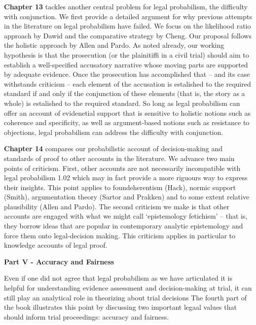 \documentclass[10pt,dvipsnames,enabledeprecatedfontcommands]{scrartcl}
\begin{document}
\textbf{Chapter 13} tackles another central problem for legal
probabilism, the difficulty with conjunction. We first provide a
detailed argument for why previous attempts in the literature on legal
probabilism have failed. We focus on the likelihood ratio approach by
Dawid and the comparative strategy by Cheng. Our proposal follows the
holistic approach by Allen and Pardo. As noted already, our working
hypothesis is that the prosecution (or the plainitiffi in a civil trial)
should aim to establish a well-specified accusatory narrative whose
moving parts are supported by adequate evidence. Once the prosecution
has accomplished that -- and its case withstands criticism -- each
element of the accusation is estalished to the required standard if and
only if the conjunction of these elements (that is, the story as a
whole) is estalished to the required standard. So long as legal
probabilism can offer an account of evidenetial support that is
sensitive to holistic notions such as coherence and specificity, as well
as argument-based notions such as resistance to objections, legal
probabilism can address the difficulty with conjunction.

\textbf{Chapter 14} compares our probabilistic account of
decision-making and standards of proof to other accounts in the
literature. We advance two main points of criticism. First, other
accounts are not necessarily incompatible with legal probabilism 1.02
which may in fact provide a more riguours way to express their insights.
This point applies to foundeherentism (Hack), normic support (Smith),
argumentation theory (Sartor and Prakken) and to some extent relative
plausibility (Allen and Pardo). The second criticism we make is that
other accounts are engaged with what we might call `epistemology
fetichism' -- that is, they borrow ideas that are popular in
contemporary analytic epistemology and force them onto legal-decision
making. This criticism applies in particular to knowledge accounts of
legal proof.

\vspace{3mm} \noindent
\textbf{Part V - Accuracy and Fairness}

\noindent
Even if one did not agree that legal probabilism as we have articulated
it is helpful for understanding evidence assessment and decision-making
at trial, it can still play an analytical role in theorizing about trial
decisions The fourth part of the book illustrates this point by
discussing two important legaal values that should inform trial
proceedings: accuracy and fairness.
\end{document}
